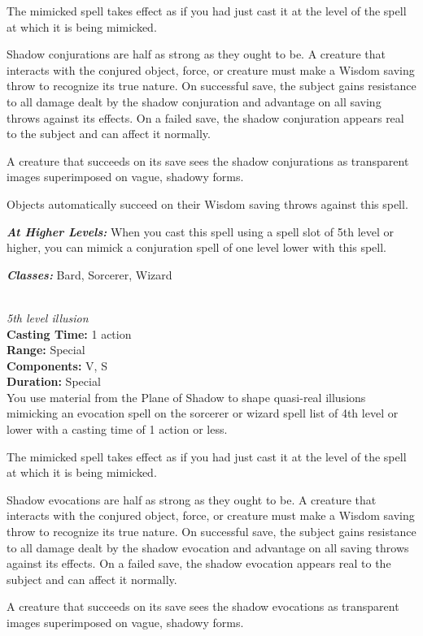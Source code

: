The mimicked spell takes effect as if you had just cast it at the level of the spell
at which it is being mimicked.

Shadow conjurations are half as strong as they ought to be. A creature that interacts
with the conjured object, force, or creature must make a Wisdom saving throw
to recognize its true nature. On successful save, the subject gains resistance to
all damage dealt by the shadow conjuration and advantage on all saving throws against
its effects. On a failed save, the shadow conjuration appears real to the subject
and can affect it normally.

A creature that succeeds on its save sees the shadow conjurations as transparent
images superimposed on vague, shadowy forms.

Objects automatically succeed on their Wisdom saving throws against this spell.

\textbf{\textit{At Higher Levels:}} When you cast this spell using a spell slot of
5th level or higher, you can mimick a conjuration spell of one level lower with this
spell.

\textbf{\textit{Classes:}} Bard, Sorcerer, Wizard

 \\
\textit{5th level illusion} \\
\textbf{Casting Time:} 1 action \\
\textbf{Range:} Special \\
\textbf{Components:} V, S \\
\textbf{Duration:} Special \\

You use material from the Plane of Shadow to shape quasi-real illusions mimicking
an evocation spell on the sorcerer or wizard spell list of 4th level or lower with
a casting time of 1 action or less.

The mimicked spell takes effect as if you had just cast it at the level of the spell
at which it is being mimicked.

Shadow evocations are half as strong as they ought to be. A creature that interacts
with the conjured object, force, or creature must make a Wisdom saving throw
to recognize its true nature. On successful save, the subject gains resistance to
all damage dealt by the shadow evocation and advantage on all saving throws against
its effects. On a failed save, the shadow evocation appears real to the subject
and can affect it normally.

A creature that succeeds on its save sees the shadow evocations as transparent
images superimposed on vague, shadowy forms.

